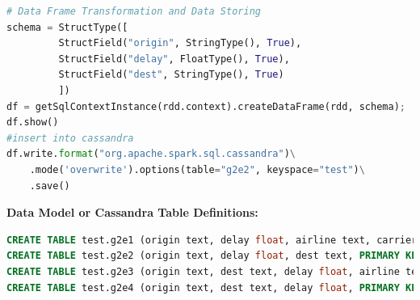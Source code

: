 \documentclass[fontsize=11pt,paper=a4]{scrartcl}
\begin{document}
\begin{lstlisting}[basicstyle=\small,language = python] 
# Data Frame Transformation and Data Storing 
schema = StructType([
         StructField("origin", StringType(), True),
         StructField("delay", FloatType(), True), 
         StructField("dest", StringType(), True)
         ])
df = getSqlContextInstance(rdd.context).createDataFrame(rdd, schema);  
df.show() 
#insert into cassandra 
df.write.format("org.apache.spark.sql.cassandra")\
    .mode('overwrite').options(table="g2e2", keyspace="test")\
    .save()
\end{lstlisting}
\textbf{Data Model or Cassandra Table Definitions: }
\begin{lstlisting}[basicstyle=\small,language = sql] 
CREATE TABLE test.g2e1 (origin text, delay float, airline text, carrier text, PRIMARY KEY (origin, delay) ); 
CREATE TABLE test.g2e2 (origin text, delay float, dest text, PRIMARY KEY (origin, delay) ); 
CREATE TABLE test.g2e3 (origin text, dest text, delay float, airline text, PRIMARY KEY ((origin, dest), delay)); 
CREATE TABLE test.g2e4 (origin text, dest text, delay float, PRIMARY KEY ((origin, dest), delay)); 
\end{lstlisting}
\end{document}
